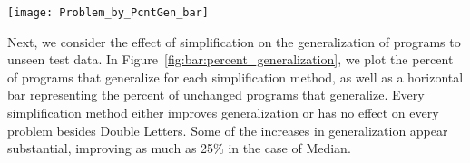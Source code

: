 
\begin{figure*}[h] %
\centering
\texttt{[image: Problem\_by\_PcntGen\_bar]} %
\caption{The proportion of simplified programs that generalize to unseen test data
	for each problem, with the proportion of unchanged programs that generalize 
	indicated with black horizontal bars.
    The number of unchanged solution programs taken into account for each problem
    is given in parentheses, representing the number of starting points for each problem.
}
\label{fig:bar:percent_generalization}
\end{figure*}

Next, we consider the effect of simplification on the generalization of programs to unseen test data. In Figure~\ref{fig:bar:percent_generalization}, we plot the percent of programs that generalize for each simplification method, as well as a horizontal bar representing the percent of unchanged programs that generalize.
Every simplification method either improves generalization or has no effect on every problem besides Double Letters.
 Some of the increases in generalization appear substantial, 
improving as much as 25\% in the case of Median.

